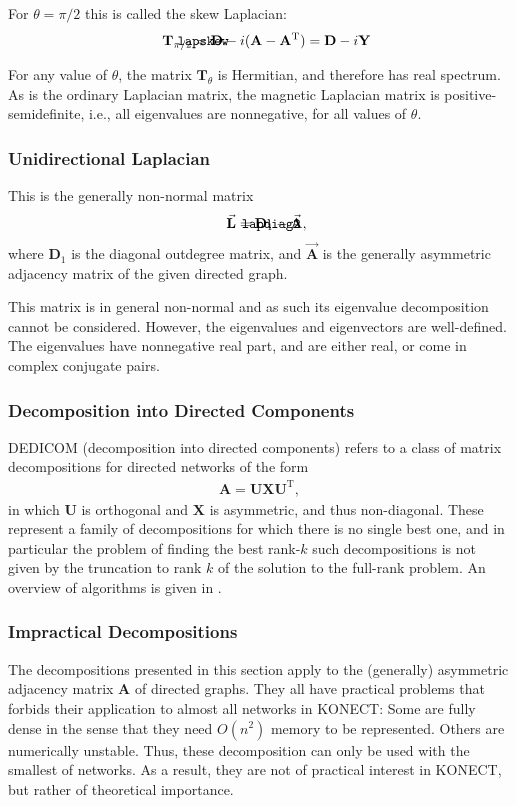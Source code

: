 \documentclass{article}
\def\mathnote#1{%
  \tag*{\rlap{\hspace\marginparsep\smash{\parbox[t]{\marginparwidth}{#1}}}}
}
\begin{document}
For $\theta = \pi/2$ this is called the skew Laplacian:
\begin{align}
  \mathnote{\texttt{lapskew}}
  \mathbf T_{\pi/2} &= \mathbf D - i (\mathbf A - \mathbf A^{\mathrm T}) 
  = \mathbf D - i \mathbf Y
\end{align}

For any value of $\theta$, the matrix $\mathbf T_{\theta}$ is Hermitian,
and therefore has real spectrum.  As is the ordinary Laplacian matrix,
the magnetic Laplacian matrix is positive-semidefinite, i.e., all
eigenvalues are nonnegative, for all values of $\theta$. 

\subsubsection{Unidirectional Laplacian}
\label{sec:decomposition.lapdiag2}
This is the generally non-normal matrix
\begin{align}
  \mathnote{\texttt{lapdiag2}}
  \vec{\mathbf L} &= \mathbf D_1 - \vec{\mathbf A}, 
\end{align}
where $\mathbf D_1$ is the diagonal outdegree matrix, and $\vec{\mathbf A}$
is the generally asymmetric adjacency matrix of the given directed
graph.  

This matrix is in general non-normal and as such its eigenvalue
decomposition cannot be considered.  However, the eigenvalues and
eigenvectors are well-defined.  The eigenvalues have nonnegative real
part, and are either real, or come in complex conjugate pairs. 

\subsubsection{Decomposition into Directed Components}
DEDICOM (decomposition into directed components) refers to a class of
matrix decompositions for directed networks of the form
\begin{align}
  \mathbf A = \mathbf U \mathbf X \mathbf U^{\mathrm T},
\end{align}
in which $\mathbf U$ is orthogonal and $\mathbf X$ is asymmetric, and
thus non-diagonal.  These represent a family of decompositions for which
there is no single best one, and in particular the problem of finding
the best rank-$k$ such decompositions is not given by the truncation to
rank $k$ of the solution to the full-rank problem.  An overview of
algorithms is given in \citep{kunegis:directed-decomposition}. 

\subsubsection{Impractical Decompositions}
The decompositions presented in this section apply to the (generally) asymmetric
adjacency matrix $\mathbf A$ of directed graphs.  
They all have practical problems that forbids their application to
almost all networks in KONECT: 
Some are fully dense in the sense that
they need $O(n^2)$ memory to be represented.  Others are numerically
unstable. 
Thus, these decomposition can only be used with the
smallest of networks.  As a result, they are not of practical interest
in KONECT, but rather of theoretical importance. 
\end{document}
